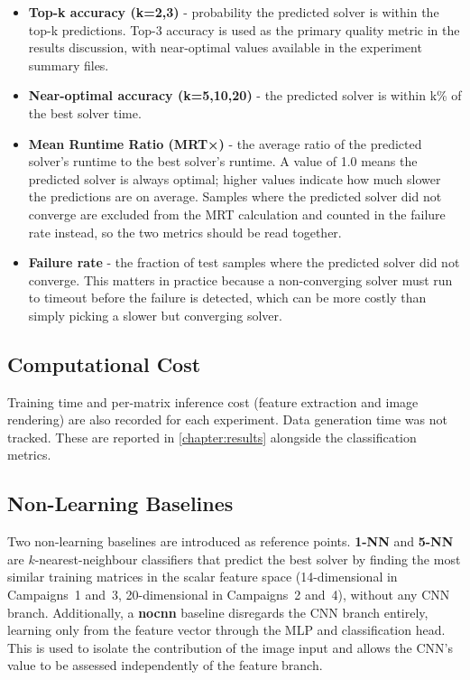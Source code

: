 \begin{itemize}
    \item \textbf{Top-k accuracy (k=2,3)} - probability the predicted solver is within the top-k predictions. Top-3 accuracy is used as the primary quality metric in the results discussion, with near-optimal values available in the experiment summary files.
    \item \textbf{Near-optimal accuracy (k=5,10,20)} - the predicted solver is within k\% of the best solver time.
    \item \textbf{Mean Runtime Ratio (MRT×)} - the average ratio of the predicted solver's runtime to the best solver's runtime. A value of 1.0 means the predicted solver is always optimal; higher values indicate how much slower the predictions are on average. Samples where the predicted solver did not converge are excluded from the MRT calculation and counted in the failure rate instead, so the two metrics should be read together.
    \item \textbf{Failure rate} - the fraction of test samples where the predicted solver did not converge. This matters in practice because a non-converging solver must run to timeout before the failure is detected, which can be more costly than simply picking a slower but converging solver.
\end{itemize}

\subsection{Computational Cost}\label{subsec:compute-cost}

Training time and per-matrix inference cost (feature extraction and image rendering) are also recorded for each experiment.
Data generation time was not tracked.
These are reported in \autoref{chapter:results} alongside the classification metrics.

\subsection{Non-Learning Baselines}\label{subsec:baselines}

Two non-learning baselines are introduced as reference points.
\textbf{1-NN} and \textbf{5-NN} are $k$-nearest-neighbour classifiers that predict the best solver
by finding the most similar training matrices in the scalar feature space
(14-dimensional in Campaigns~1 and~3, 20-dimensional in Campaigns~2 and~4), without any CNN branch.
Additionally, a \textbf{nocnn} baseline disregards the CNN branch entirely,
learning only from the feature vector through the MLP and classification head.
This is used to isolate the contribution of the image input and allows the CNN's
value to be assessed independently of the feature branch.

